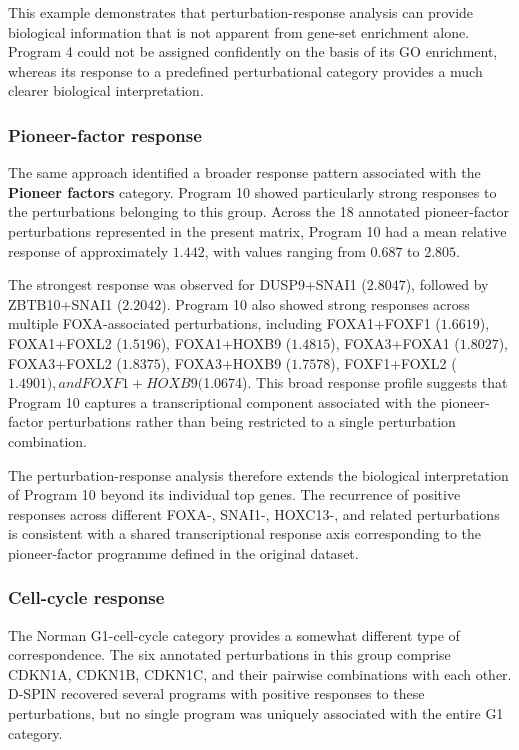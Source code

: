 \documentclass[11pt,a4paper]{article}
\begin{document}
This example demonstrates that perturbation-response analysis can provide biological information that is not apparent from gene-set enrichment alone. Program 4 could not be assigned confidently on the basis of its GO enrichment, whereas its response to a predefined perturbational category provides a much clearer biological interpretation.

\subsubsection{Pioneer-factor response}

The same approach identified a broader response pattern associated with the \textbf{Pioneer factors} category. Program 10 showed particularly strong responses to the perturbations belonging to this group. Across the 18 annotated pioneer-factor perturbations represented in the present matrix, Program 10 had a mean relative response of approximately $1.442$, with values ranging from $0.687$ to $2.805$.

The strongest response was observed for DUSP9+SNAI1 ($2.8047$), followed by ZBTB10+SNAI1 ($2.2042$). Program 10 also showed strong responses across multiple FOXA-associated perturbations, including FOXA1+FOXF1 ($1.6619$), FOXA1+FOXL2 ($1.5196$), FOXA1+HOXB9 ($1.4815$), FOXA3+FOXA1 ($1.8027$), FOXA3+FOXL2 ($1.8375$), FOXA3+HOXB9 ($1.7578$), FOXF1+FOXL2 ($1.4901), and FOXF1+HOXB9 ($1.0674). This broad response profile suggests that Program 10 captures a transcriptional component associated with the pioneer-factor perturbations rather than being restricted to a single perturbation combination.

The perturbation-response analysis therefore extends the biological interpretation of Program 10 beyond its individual top genes. The recurrence of positive responses across different FOXA-, SNAI1-, HOXC13-, and related perturbations is consistent with a shared transcriptional response axis corresponding to the pioneer-factor programme defined in the original dataset.

\subsubsection{Cell-cycle response}

The Norman G1-cell-cycle category provides a somewhat different type of correspondence. The six annotated perturbations in this group comprise CDKN1A, CDKN1B, CDKN1C, and their pairwise combinations with each other. D-SPIN recovered several programs with positive responses to these perturbations, but no single program was uniquely associated with the entire G1 category.
\end{document}
